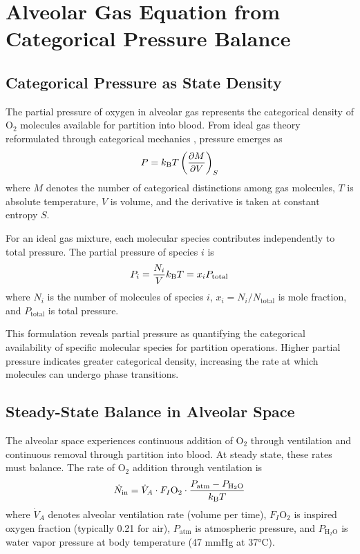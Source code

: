 \section{Alveolar Gas Equation from Categorical Pressure Balance}
\label{sec:alveolar_gas}

\subsection{Categorical Pressure as State Density}

The partial pressure of oxygen in alveolar gas represents the categorical density of O$_{2}$ molecules available for partition into blood. From ideal gas theory reformulated through categorical mechanics \cite{sachikonye2024gas}, pressure emerges as
\begin{equation}
P = k_{\mathrm{B}} T \left(\frac{\partial M}{\partial V}\right)_{S}
\end{equation}
where $M$ denotes the number of categorical distinctions among gas molecules, $T$ is absolute temperature, $V$ is volume, and the derivative is taken at constant entropy $S$.

For an ideal gas mixture, each molecular species contributes independently to total pressure. The partial pressure of species $i$ is
\begin{equation}
P_{i} = \frac{N_{i}}{V} k_{\mathrm{B}} T = x_{i} P_{\mathrm{total}}
\end{equation}
where $N_{i}$ is the number of molecules of species $i$, $x_{i} = N_{i}/N_{\mathrm{total}}$ is mole fraction, and $P_{\mathrm{total}}$ is total pressure.

This formulation reveals partial pressure as quantifying the categorical availability of specific molecular species for partition operations. Higher partial pressure indicates greater categorical density, increasing the rate at which molecules can undergo phase transitions.

\subsection{Steady-State Balance in Alveolar Space}

The alveolar space experiences continuous addition of O$_{2}$ through ventilation and continuous removal through partition into blood. At steady state, these rates must balance. The rate of O$_{2}$ addition through ventilation is
\begin{equation}
\dot{N}_{\mathrm{in}} = \dot{V}_{A} \cdot F_{I}\mathrm{O}_{2} \cdot \frac{P_{\mathrm{atm}} - P_{\mathrm{H}_{2}\mathrm{O}}}{k_{\mathrm{B}} T}
\end{equation}
where $\dot{V}_{A}$ denotes alveolar ventilation rate (volume per time), $F_{I}\mathrm{O}_{2}$ is inspired oxygen fraction (typically 0.21 for air), $P_{\mathrm{atm}}$ is atmospheric pressure, and $P_{\mathrm{H}_{2}\mathrm{O}}$ is water vapor pressure at body temperature (47 mmHg at 37°C).

